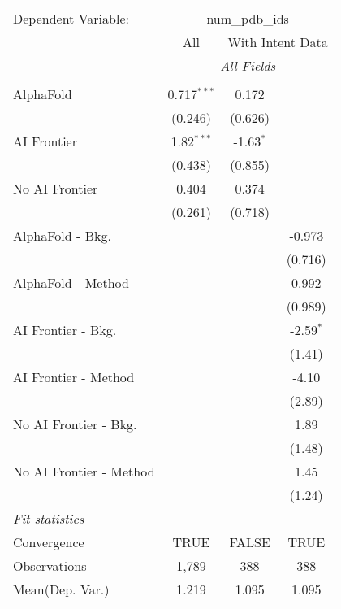 \begingroup
\centering
\begin{tabular}{lccc}
   \tabularnewline \midrule \midrule
   Dependent Variable: & \multicolumn{3}{c}{num\_pdb\_ids}\\
 & \multicolumn{1}{c}{All} & \multicolumn{2}{c}{With Intent Data} \\
\cmidrule(lr){2-2} \cmidrule(lr){3-4}
 & \multicolumn{3}{c}{\textit{All Fields}} \\ \\
   AlphaFold               & 0.717$^{***}$ & 0.172       &   \\   
                           & (0.246)       & (0.626)     &   \\   
   AI Frontier             & 1.82$^{***}$  & -1.63$^{*}$ &   \\   
                           & (0.438)       & (0.855)     &   \\   
   No AI Frontier          & 0.404         & 0.374       &   \\   
                           & (0.261)       & (0.718)     &   \\   
   AlphaFold - Bkg.        &               &             & -0.973\\   
                           &               &             & (0.716)\\   
   AlphaFold - Method      &               &             & 0.992\\   
                           &               &             & (0.989)\\   
   AI Frontier - Bkg.      &               &             & -2.59$^{*}$\\   
                           &               &             & (1.41)\\   
   AI Frontier - Method    &               &             & -4.10\\   
                           &               &             & (2.89)\\   
   No AI Frontier - Bkg.   &               &             & 1.89\\   
                           &               &             & (1.48)\\   
   No AI Frontier - Method &               &             & 1.45\\   
                           &               &             & (1.24)\\   
   \midrule
   \emph{Fit statistics}\\
   Convergence             &TRUE           & FALSE       & TRUE\\  
   Observations            & 1,789         & 388         & 388\\  
Mean(Dep. Var.) & 1.219 & 1.095 & 1.095 \\
   

\end{tabular}
